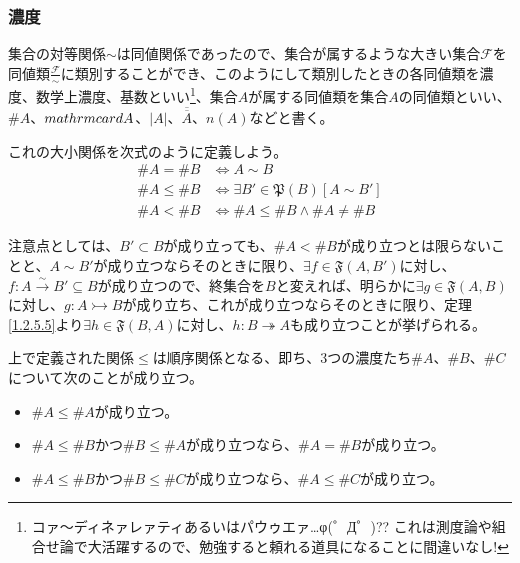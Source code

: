 \documentclass[dvipdfmx]{jsarticle}
\begin{document}
\subsubsection{濃度}%
\begin{dfn}
集合の対等関係$\sim$は同値関係であったので、集合が属するような大きい集合$\mathcal{F}$を同値類$\frac{\mathcal{F}}{\sim}$に類別することができ、このようにして類別したときの各同値類を濃度、数学上濃度、基数といい\footnote{コァ～ディネァレァティあるいはパウゥエァ…φ(゜Д゜)?? これは測度論や組合せ論で大活躍するので、勉強すると頼れる道具になることに間違いなし!}、集合$A$が属する同値類を集合$A$の同値類といい、$\# A$、$\\mathrm{card} A$、$|A|$、$\overline{\overline{A}}$、$n(A)$などと書く。
\end{dfn}
\begin{dfn}
これの大小関係を次式のように定義しよう。
\begin{align*}
\# A = \# B &\Leftrightarrow A \sim B\\
\# A \leq \# B &\Leftrightarrow \exists B'\in \mathfrak{P}(B)\left[ A \sim B' \right]\\
\# A < \# B &\Leftrightarrow \# A \leq \# B \land \# A \neq \# B
\end{align*}
\end{dfn}\par
注意点としては、$B' \subset B$が成り立っても、$\# A < \# B$が成り立つとは限らないことと、$A \sim B'$が成り立つならそのときに限り、$\exists f\in \mathfrak{F}\left( A,B' \right)$に対し、$f:A\overset{\sim}{\rightarrow}B' \subseteq B$が成り立つので、終集合を$B$と変えれば、明らかに$\exists g\in \mathfrak{F}(A,B)$に対し、$g:A \rightarrowtail B$が成り立ち、これが成り立つならそのときに限り、定理\ref{1.2.5.5}より$\exists h\in \mathfrak{F}(B,A)$に対し、$h:B \twoheadrightarrow A$も成り立つことが挙げられる。
\begin{thm}\label{1.2.7.3}
上で定義された関係$\leq$は順序関係となる、即ち、3つの濃度たち$\# A$、$\# B$、$\# C$について次のことが成り立つ。
\begin{itemize}
\item
  $\# A \leq \# A$が成り立つ。
\item
  $\# A \leq \# B$かつ$\# B \leq \# A$が成り立つなら、$\# A = \# B$が成り立つ。
\item
  $\# A \leq \# B$かつ$\# B \leq \# C$が成り立つなら、$\# A \leq \# C$が成り立つ。
\end{itemize}
\end{thm}\par
\end{document}
